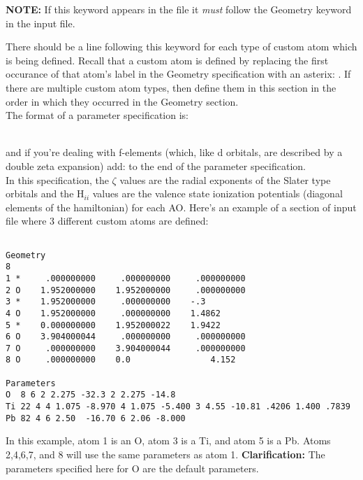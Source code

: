 {\bf NOTE:} If this keyword appears in the file it {\em must} follow
the {\sf Geometry} keyword in the input file.

There should be a line following this keyword for each type of custom
atom which is being defined.  Recall that a custom atom is defined by
replacing the first occurance of that atom's label in the Geometry
specification with an asterix: {\tt *}. If there are multiple custom
atom types, then define them in this section in the order in which
they occurred in the Geometry section. \\

\noindent The format of a parameter specification is:

{\small {} 
  
  
   
 } \\

\noindent and if you're dealing with f-elements (which, like d orbitals, are described by a double zeta expansion) add:
{\small {}   
 }
to the end of the parameter specification. \\

\noindent In this specification, the $\zeta$ values are the radial exponents of
the Slater type orbitals and the H$_{ii}$ values are the valence state
ionization potentials (diagonal elements of the hamiltonian) for each AO.
Here's an example of a section of input file where 3 different custom
atoms are defined:

\shrinkspacing
\begin{verbatim}

Geometry
8
1 *     .000000000     .000000000     .000000000
2 O    1.952000000    1.952000000     .000000000
3 *    1.952000000     .000000000    -.3
4 O    1.952000000     .000000000    1.4862
5 *    0.000000000    1.952000022    1.9422
6 O    3.904000044     .000000000     .000000000
7 O     .000000000    3.904000044     .000000000
8 O     .000000000    0.0                4.152

Parameters
O  8 6 2 2.275 -32.3 2 2.275 -14.8
Ti 22 4 4 1.075 -8.970 4 1.075 -5.400 3 4.55 -10.81 .4206 1.400 .7839
Pb 82 4 6 2.50  -16.70 6 2.06 -8.000

\end{verbatim}
\resumespacing
 
In this example, atom 1 is an O, atom 3 is a Ti, and atom 5 is a Pb.
Atoms 2,4,6,7, and 8 will use the same parameters as atom 1.  {\bf
Clarification:} The parameters specified here for O are the default
parameters. 


